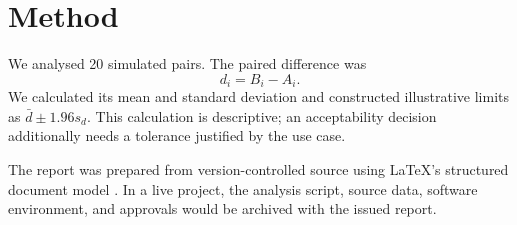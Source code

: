 \chapter{Method}
\label{chap:method}

We analysed 20 simulated pairs. The paired difference was
\begin{equation}
  d_i=B_i-A_i.
  \label{eq:difference}
\end{equation}
We calculated its mean and standard deviation and constructed illustrative
limits as $\bar d\pm1.96s_d$. This calculation is descriptive; an acceptability
decision additionally needs a tolerance justified by the use case.

The report was prepared from version-controlled source using \LaTeX{}'s structured
document model \parencite{lamport1994}. In a live project, the analysis script,
source data, software environment, and approvals would be archived with the
issued report.
